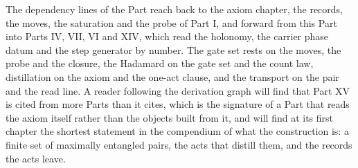The dependency lines of the Part reach back to the axiom chapter, the records, the moves, the saturation and the probe of Part I, and forward from this Part into Parts IV, VII, VI and XIV, which read the holonomy, the carrier phase datum and the step generator by number. The gate set rests on the moves, the probe and the closure, the Hadamard on the gate set and the count law, distillation on the axiom and the one-act clause, and the transport on the pair and the read line. A reader following the derivation graph will find that Part XV is cited from more Parts than it cites, which is the signature of a Part that reads the axiom itself rather than the objects built from it, and will find at its first chapter the shortest statement in the compendium of what the construction is: a finite set of maximally entangled pairs, the acts that distill them, and the records the acts leave.

